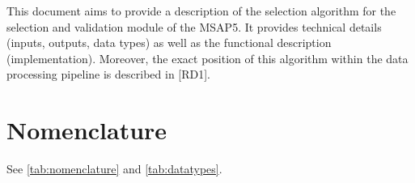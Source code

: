 \documentclass[a4paper, oneside, 11pt, article, english]{memoir}
\begin{document}
This document aims to provide a description of the selection algorithm for the selection and validation module of the MSAP5. 
It provides technical details (inputs, outputs, data types) as well as the
functional description (implementation). 
Moreover, the exact position of this algorithm within the data processing pipeline is described in [RD1]. 



\section{Nomenclature}
\label{sec:nomenclature}


See \ref{tab:nomenclature} and \ref{tab:datatypes}.
\end{document}

